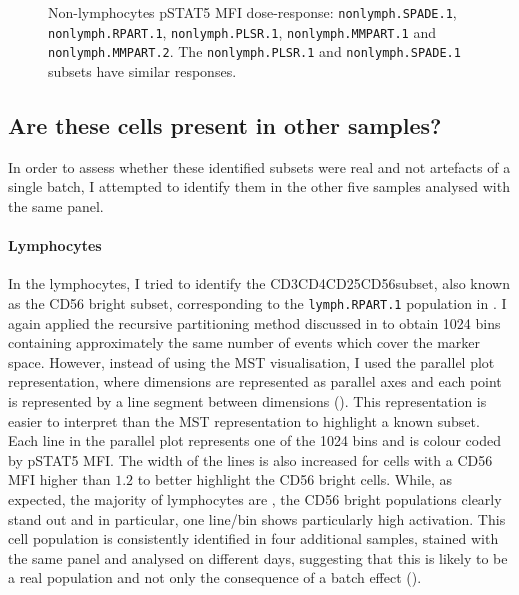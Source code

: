 \begin{figure}
\begin{minipage}{.5\textwidth}
\end{minipage}
\begin{minipage}{.3\textwidth}
{ Non-lymphocytes pSTAT5 MFI dose-response: \texttt{nonlymph.SPADE.1}, \texttt{nonlymph.RPART.1}, \texttt{nonlymph.PLSR.1}, \texttt{nonlymph.MMPART.1} and \texttt{nonlymph.MMPART.2}. }
{
    The \texttt{nonlymph.PLSR.1} and \texttt{nonlymph.SPADE.1} subsets have similar responses.
}
\end{minipage}
\end{figure}



\clearpage

\subsection{Are these cells present in other samples?}

In order to assess whether these identified subsets were real and not artefacts of a single batch, I attempted to identify them in the other five samples analysed with the same panel.

\paragraph{Lymphocytes}

In the lymphocytes, I tried to identify the CD3\negative CD4\negative CD25\negative CD56\positive  subset, also known as the CD56 bright subset, corresponding to the \texttt{lymph.RPART.1} population in .
I again applied the recursive partitioning method discussed in  to obtain 1024 bins containing approximately the same number of events which cover the marker space.
However, instead of using the \gls{MST} visualisation, I used the parallel plot representation, where dimensions are represented as parallel axes and each point is represented by a line segment between dimensions ().
This representation is easier to interpret than the \gls{MST} representation to highlight a known subset.
Each line in the parallel plot represents one of the 1024 bins and is colour coded by pSTAT5 MFI.
The width of the lines is also increased for cells with a CD56 MFI higher than $1.2$ to better highlight the CD56 bright cells.
While, as expected, the majority of lymphocytes are \low, the CD56 bright populations clearly stand out and in particular, one line/bin shows particularly high activation.
This cell population is consistently identified in four additional samples, stained with the same panel and analysed on different days, suggesting that this is likely to be a real population and not only the consequence of a batch effect ().


